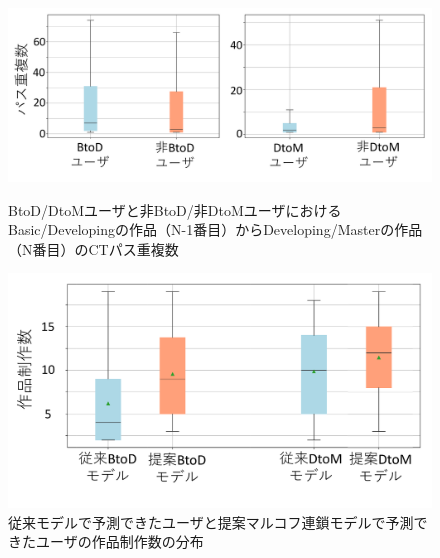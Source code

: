 \documentclass[submit]{ipsj}
\begin{document}


\begin{figure}[t]
	\centering
	\includegraphics[width=1\linewidth]{Okamoto_fig/add-btod-dtom.pdf}
        \vspace{-7mm}
	\caption{BtoD/DtoMユーザと非BtoD/非DtoMユーザにおけるBasic/Developingの作品（N-1番目）からDeveloping/Masterの作品（N番目）のCTパス重複数}
	\label{fig:add-btod}

 \centering
	\includegraphics[width=0.75\linewidth]{Okamoto_fig/btod-dtom-path.pdf}
	\caption{従来モデルで予測できたユーザと提案マルコフ連鎖モデルで予測できたユーザの作品制作数の分布}
	\label{fig:btod-path}
    \vspace{-4mm}
\end{figure}
\end{document}
